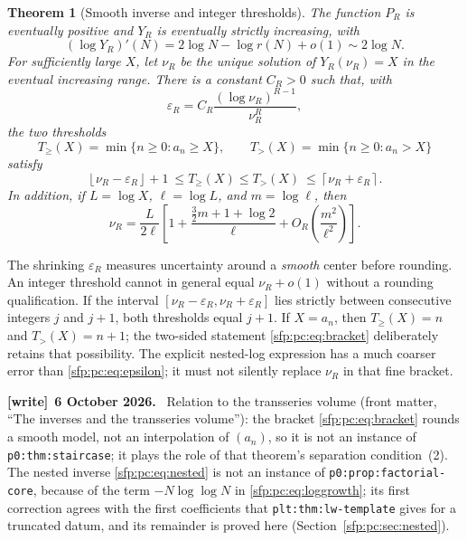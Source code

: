 \documentclass[11pt,letterpaper]{article}
\numberwithin{equation}{section}
\newtheorem{theorem}{Theorem}[section]
\theoremstyle{definition}\newtheorem{definition}[theorem]{Definition}
\theoremstyle{remark}\newtheorem{remark}[theorem]{Remark}
\newcommand{\eps}{\varepsilon}
\newcommand{\ceil}[1]{\left\lceil #1\right\rceil}
\newcommand{\floor}[1]{\left\lfloor #1\right\rfloor}
\newcommand{\file}[1]{\nolinkurl{#1}}
\newenvironment{writenote}[1][]{\par\smallskip\begingroup\small
 \noindent\textbf{[write]}\if\relax\detokenize{#1}\relax\else~\textbf{#1.}\fi\ }%
 {\par\endgroup\smallskip}
\begin{document}
\begin{theorem}[Smooth inverse and integer thresholds]\label{sfp:pc:thm:inverse}
The function $P_R$ is eventually positive and $Y_R$ is eventually
strictly increasing, with
\begin{equation}\label{sfp:pc:eq:Yderivative}
 (\log Y_R)'(N)=2\log N-\log r(N)+o(1)\sim2\log N.
\end{equation}
For sufficiently large $X$, let $\nu_R$ be the unique solution of
$Y_R(\nu_R)=X$ in the eventual increasing range. There is a constant
$C_R>0$ such that, with
\begin{equation}\label{sfp:pc:eq:epsilon}
 \eps_R=C_R\frac{(\log\nu_R)^{R-1}}{\nu_R^R},
\end{equation}
the two thresholds
\[
 T_{\geq}(X)=\min\{n\geq0:a_n\geq X\},\qquad
 T_{>}(X)=\min\{n\geq0:a_n>X\}
\]
satisfy
\begin{equation}\label{sfp:pc:eq:bracket}
 \floor{\nu_R-\eps_R}+1
 \ \leq T_{\geq}(X)\leq T_{>}(X)
 \ \leq\ceil{\nu_R+\eps_R}.
\end{equation}
In addition, if $L=\log X$, $\ell=\log L$, and $m=\log\ell$,
then
\begin{equation}\label{sfp:pc:eq:nested}
 \nu_R=\frac{L}{2\ell}
       \left[1+\frac{\tfrac32m+1+\log2}{\ell}
               +O_R\left(\frac{m^2}{\ell^2}\right)\right].
\end{equation}
\end{theorem}

The shrinking $\eps_R$ measures uncertainty around a \emph{smooth}
center before rounding. An integer threshold cannot in general equal
$\nu_R+o(1)$ without a rounding qualification. If the interval
$[\nu_R-\eps_R,\nu_R+\eps_R]$ lies strictly between consecutive
integers $j$ and $j+1$, both thresholds equal $j+1$. If $X=a_n$,
then $T_{\geq}(X)=n$ and $T_>(X)=n+1$; the two-sided statement
\eqref{sfp:pc:eq:bracket} deliberately retains that possibility.
The explicit nested-log expression has a much coarser error than
\eqref{sfp:pc:eq:epsilon}; it must not silently replace $\nu_R$ in that
fine bracket.
\begin{writenote}[6 October 2026]
Relation to the transseries volume \cite{TSvol} (front matter, ``The inverses and the transseries volume''): the bracket \eqref{sfp:pc:eq:bracket} rounds a smooth model, not an interpolation of $(a_n)$, so it is not an instance of \file{p0:thm:staircase}; it plays the role of that theorem's separation condition~(2). The nested inverse \eqref{sfp:pc:eq:nested} is not an instance of \file{p0:prop:factorial-core}, because of the term $-N\log\log N$ in \eqref{sfp:pc:eq:loggrowth}; its first correction agrees with the first coefficients that \file{plt:thm:lw-template} gives for a truncated datum, and its remainder is proved here (Section~\ref{sfp:pc:sec:nested}).
\end{writenote}
\end{document}

